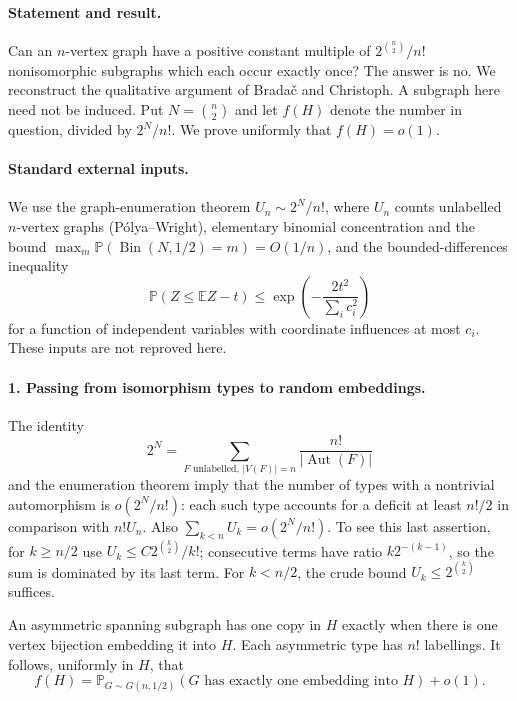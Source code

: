 \paragraph{Statement and result.}
Can an \(n\)-vertex graph have a positive constant multiple of
\(2^{\binom n2}/n!\) nonisomorphic subgraphs which each occur exactly
once? The answer is no. We reconstruct the qualitative argument of
Brada\v{c} and Christoph. A subgraph here need not be induced.
Put \(N=\binom n2\) and let \(f(H)\) denote the number in question,
divided by \(2^N/n!\). We prove uniformly that \(f(H)=o(1)\).

\paragraph{Standard external inputs.}
We use the graph-enumeration theorem \(U_n\sim2^N/n!\), where \(U_n\)
counts unlabelled \(n\)-vertex graphs (P\'olya--Wright), elementary
binomial concentration and the bound
\(\max_m\mathbb P(\operatorname{Bin}(N,1/2)=m)=O(1/n)\),
and the bounded-differences inequality
\[
 \mathbb P(Z\leq\mathbb EZ-t)
 \leq\exp\left(-\frac{2t^2}{\sum_i c_i^2}\right)
 \tag{1}
\]
for a function of independent variables with coordinate influences
at most \(c_i\). These inputs are not reproved here.

\paragraph{1. Passing from isomorphism types to random embeddings.}
The identity
\[
 2^N=\sum_{F\text{ unlabelled},\,|V(F)|=n}
       \frac{n!}{|\operatorname{Aut}(F)|}
\]
and the enumeration theorem imply that the number of types with a
nontrivial automorphism is \(o(2^N/n!)\): each such type accounts for
a deficit at least \(n!/2\) in comparison with \(n!U_n\).
Also \(\sum_{k<n}U_k=o(2^N/n!)\). To see this last assertion, for
\(k\geq n/2\) use \(U_k\leq C2^{\binom k2}/k!\); consecutive terms
have ratio \(k2^{-(k-1)}\), so the sum is dominated by its last term.
For \(k<n/2\), the crude bound \(U_k\leq2^{\binom k2}\) suffices.

An asymmetric spanning subgraph has one copy in \(H\) exactly when
there is one vertex bijection embedding it into \(H\). Each asymmetric
type has \(n!\) labellings. It follows, uniformly in \(H\), that
\[
 f(H)=\mathbb P_{G\sim G(n,1/2)}
       (G\text{ has exactly one embedding into }H)+o(1).
 \tag{2}
\]

